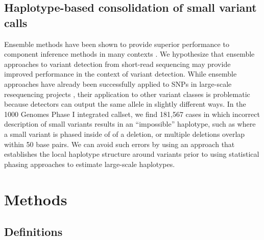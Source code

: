 \documentclass{article}
\begin{document}
\subsection{Haplotype-based consolidation of small variant calls}
\label{sec:ensemble}

Ensemble methods have been shown to provide superior performance to component inference methods in many contexts \citep{opmac99}.  We hypothesize that ensemble approaches to variant detection from short-read sequencing may provide improved performance in the context of variant detection.  While ensemble approaches have already been successfully applied to SNPs in large-scale resequencing projects \citep{1000GPhaseI}, their application to other variant classes is problematic because detectors can output the same allele in slightly different ways.  In the 1000 Genomes Phase I integrated callset, we find 181,567 cases in which incorrect description of small variants results in an ``impossible'' haplotype, such as where a small variant is phased inside of of a deletion, or multiple deletions overlap within 50 base pairs.  We can avoid such errors by using an approach that establishes the local haplotype structure around variants prior to using statistical phasing approaches to estimate large-scale haplotypes.



\section{Methods}
\label{sec:model}

\subsection{Definitions}
\end{document}

